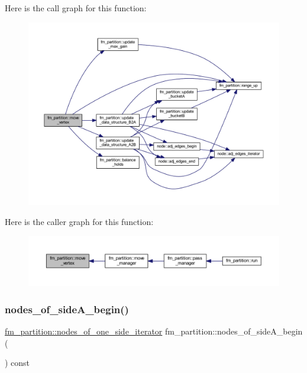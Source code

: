 Here is the call graph for this function\+:\nopagebreak
\begin{figure}[H]
\begin{center}
\leavevmode
\includegraphics[width=350pt]{classfm__partition_ac1167c6595a9f582ae98c9f555029d9b_cgraph}
\end{center}
\end{figure}
Here is the caller graph for this function\+:\nopagebreak
\begin{figure}[H]
\begin{center}
\leavevmode
\includegraphics[width=350pt]{classfm__partition_ac1167c6595a9f582ae98c9f555029d9b_icgraph}
\end{center}
\end{figure}
\mbox{\label{classfm__partition_adad3bf33efb4a2b1b0feadeafb33f5fd}} 
\subsubsection{\texorpdfstring{nodes\+\_\+of\+\_\+side\+A\+\_\+begin()}{nodes\_of\_sideA\_begin()}}
{\footnotesize\ttfamily \mbox{\hyperlink{classfm__partition_ad6cca73d48cc73d7bee1f52bf1c9a9fe}{fm\+\_\+partition\+::nodes\+\_\+of\+\_\+one\+\_\+side\+\_\+iterator}} fm\+\_\+partition\+::nodes\+\_\+of\+\_\+side\+A\+\_\+begin (\begin{DoxyParamCaption}{ }\end{DoxyParamCaption}) const}

